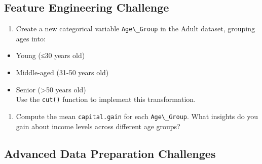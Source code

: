 \documentclass[
  11pt,
]{book}
\newcommand{\passthrough}[1]{#1}
\providecommand{\tightlist}{%
  \setlength{\itemsep}{0pt}\setlength{\parskip}{0pt}}
\theoremstyle{definition}
\theoremstyle{definition}
\theoremstyle{definition}
\theoremstyle{definition}
\theoremstyle{remark}
\begin{document}
\subsection*{Feature Engineering Challenge}\label{feature-engineering-challenge}


\begin{enumerate}
\def\labelenumi{\arabic{enumi}.}
\setcounter{enumi}{13}
\tightlist
\item
  Create a new categorical variable \passthrough{\lstinline!Age\_Group!} in the Adult dataset, grouping ages into:\\
\end{enumerate}

\begin{itemize}
\tightlist
\item
  Young (≤30 years old)\\
\item
  Middle-aged (31-50 years old)\\
\item
  Senior (\textgreater50 years old)\\
  Use the \passthrough{\lstinline!cut()!} function to implement this transformation.
\end{itemize}

\begin{enumerate}
\def\labelenumi{\arabic{enumi}.}
\setcounter{enumi}{14}
\tightlist
\item
  Compute the mean \passthrough{\lstinline!capital.gain!} for each \passthrough{\lstinline!Age\_Group!}. What insights do you gain about income levels across different age groups?
\end{enumerate}

\subsection*{Advanced Data Preparation Challenges}\label{advanced-data-preparation-challenges}
\end{document}

